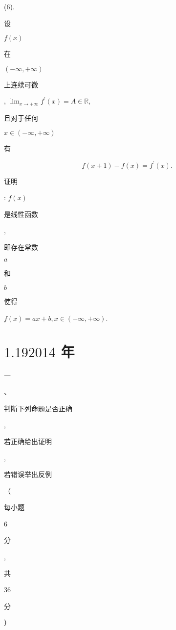 \documentclass[10pt]{article}
\begin{document}
(6). \begin{CJK}{UTF8}{mj}设\end{CJK} $f(x)$ \begin{CJK}{UTF8}{mj}在\end{CJK} $(-\infty,+\infty)$ \begin{CJK}{UTF8}{mj}上连续可微\end{CJK}, $\lim _{x \rightarrow+\infty} f^{\prime}(x)=A \in \mathbb{R}$, \begin{CJK}{UTF8}{mj}且对于任何\end{CJK} $x \in(-\infty,+\infty)$ \begin{CJK}{UTF8}{mj}有\end{CJK}
$$
f(x+1)-f(x)=f^{\prime}(x) .
$$
\begin{CJK}{UTF8}{mj}证明\end{CJK}: $f(x)$ \begin{CJK}{UTF8}{mj}是线性函数\end{CJK}, \begin{CJK}{UTF8}{mj}即存在常数\end{CJK} $a$ \begin{CJK}{UTF8}{mj}和\end{CJK} $b$ \begin{CJK}{UTF8}{mj}使得\end{CJK} $f(x)=a x+b, x \in(-\infty,+\infty)$.

\section{$1.192014$ 年}
\begin{CJK}{UTF8}{mj}一\end{CJK}、\begin{CJK}{UTF8}{mj}判断下列命题是否正确\end{CJK}, \begin{CJK}{UTF8}{mj}若正确给出证明\end{CJK}, \begin{CJK}{UTF8}{mj}若错误举出反例\end{CJK}（\begin{CJK}{UTF8}{mj}每小题\end{CJK} 6 \begin{CJK}{UTF8}{mj}分\end{CJK}, \begin{CJK}{UTF8}{mj}共\end{CJK} 36 \begin{CJK}{UTF8}{mj}分\end{CJK}）
\end{document}
